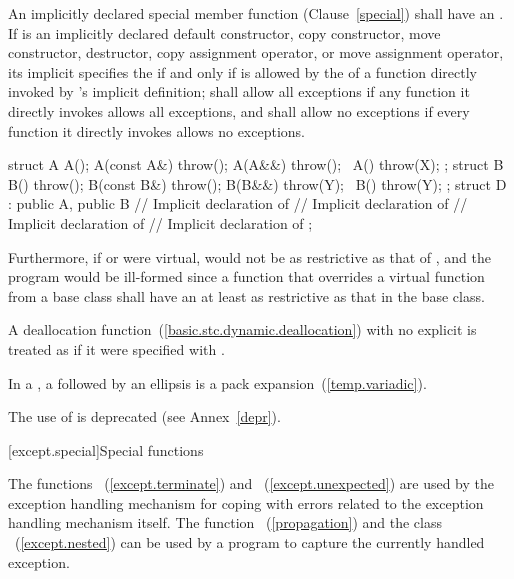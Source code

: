 \pnum
An implicitly declared special member function (Clause~\ref{special}) shall have an
.
If
is an implicitly declared default constructor, copy constructor,
move constructor,
destructor,
copy assignment operator,
or move assignment operator,
its implicit
 specifies
the
if and only if
is allowed by the  of a function directly
invoked by 's
implicit
definition;
shall allow all exceptions if any function it directly invokes allows all
exceptions, and
shall allow no exceptions if every function it directly invokes allows no
exceptions.
\enterexample
\begin{codeblock}
struct A {
  A();
  A(const A&) throw();
  A(A&&) throw();
  ~A() throw(X);
};
struct B {
  B() throw();
  B(const B&) throw();
  B(B&&) throw(Y);
  ~B() throw(Y);
};
struct D : public A, public B {
    // Implicit declaration of 
    // Implicit declaration of 
    // Implicit declaration of 
    // Implicit declaration of 
};
\end{codeblock}

Furthermore, if
or
were virtual,
would not be as restrictive as that of
,
and the program would be ill-formed since a function that overrides a virtual
function from a base class shall have an 
 at least as restrictive as that in the base class.
\exitexample

\pnum
A deallocation function~(\ref{basic.stc.dynamic.deallocation}) with no explicit 
 is treated as if it were specified with
.

\pnum
In a , a
 followed by an ellipsis is a
pack expansion~(\ref{temp.variadic}).

\pnum
\enternote The use of  is deprecated
(see Annex~\ref{depr}). \exitnote%

[except.special]{Special functions}

\pnum
The functions ~(\ref{except.terminate}) and
~(\ref{except.unexpected}) are used by the exception
handling mechanism for coping with errors related to the exception handling
mechanism itself. The function
~(\ref{propagation}) and the class
~(\ref{except.nested}) can be used by a program to
capture the currently handled exception.

